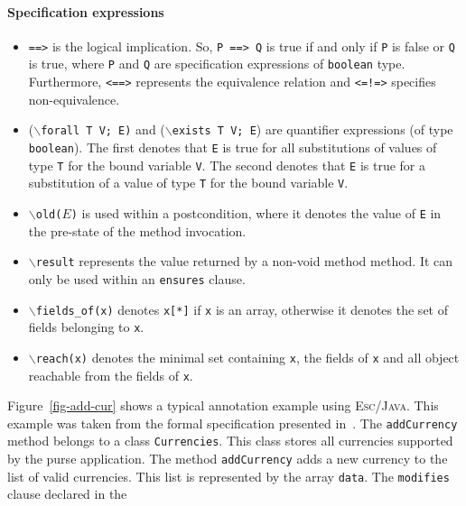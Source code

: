 \documentclass[a4paper]{llncs}
\newcommand{\escj}{\textsc{Esc/Java}}
\begin{document}
 
 
\paragraph{\bf Specification expressions} 
\begin{itemize} 
\item{\texttt{==>}} is the logical implication. So, \texttt{P 
==> Q} is true if and only if \texttt{P} is false or \texttt{Q} is 
true, where \texttt{P} and \texttt{Q} are specification expressions of  
\texttt{boolean} type. Furthermore, \texttt{<==>} represents the 
equivalence relation and \texttt{<=!=>} specifies non-equivalence. 
 
\item {($\backslash$\texttt{forall T V; E)} and 
($\backslash$\texttt{exists T V; E})} are quantifier expressions (of 
type \texttt{boolean}).  The first denotes that \texttt{E} is true 
for all substitutions of values of type \texttt{T} for the bound 
variable \texttt{V}. The second denotes that \texttt{E} is true 
for a substitution of a value of type \texttt{T} for the bound 
variable \texttt{V}. 
 
\item{\texttt{$\backslash$old($E$)}} is used within a postcondition, where it
denotes the value of \texttt{E} in the pre-state of the method invocation. 
 
\item {\tt$\backslash$result} represents the value returned by 
a non-void method method. It can only be used within an 
\texttt{ensures} clause. 

\item{\texttt{$\backslash$fields\_of(x)}} denotes \texttt{x[*]} if
\texttt{x} is an array, otherwise it denotes the set of fields
belonging to \texttt{x}.

\item{\texttt{$\backslash$reach(x)}} denotes the minimal set
containing \texttt{x}, the fields of \texttt{x} and all object
reachable from the fields of \texttt{x}.
\end{itemize} 
Figure~\ref{fig-add-cur} shows a typical annotation example using 
\escj. This example was taken from the formal specification presented
in~\cite{CH01Url}. The \texttt{addCurrency}
method belongs
to a class \texttt{Currencies}. This class stores all currencies 
supported by the purse application. The method 
\texttt{addCurrency} adds a new currency to the list of valid 
currencies. This list is represented by the 
array \texttt{data}. The \texttt{modifies} clause declared in the 
\end{document}
